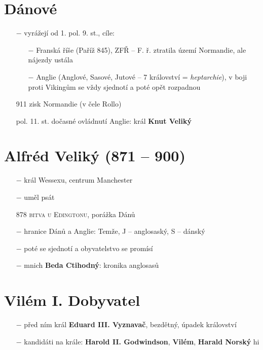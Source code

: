 \documentclass{article}
\begin{document}
\section*{Dánové}
\begin{itemize}
    \vspace{-0.5em}
    \setlength\itemsep{0.15em}
    \item[$-$] vyrážejí od 1. pol. 9. st., cíle:
    \begin{itemize}
        \vspace{-0.5em}
        \setlength\itemsep{0.15em}
        \item[$-$] Franská říše (Paříž 845), ZFŘ -- F. ř. ztratila území Normandie, ale nájezdy ustála
        \item[$-$] Anglie (Anglové, Sasové, Jutové -- 7 království = \textit{heptarchie}), v boji proti Vikingům se vždy sjednotí a poté opět rozpadnou
    \end{itemize}
    \item[911] zisk Normandie (v čele Rollo)
    \item[pol. 11. st.] dočasné ovládnutí Anglie: král \textbf{Knut Veliký}
\end{itemize}

\section*{Alfréd Veliký (871 -- 900)}
\begin{itemize}
    \vspace{-0.5em}
    \setlength\itemsep{0.15em}
    \item[$-$] král Wessexu, centrum Manchester
    \item[$-$] uměl psát
    \item[878] \textsc{bitva u Edingtonu}, porážka Dánů
    \item[$-$] hranice Dánů a Anglie: Temže, J -- anglosaský, S -- dánský
    \item[$-$] poté se sjednotí a obyvatelstvo se promísí
    \item[$-$] mnich \textbf{Beda Ctihodný}: kronika anglosasů
\end{itemize}

\section*{Vilém I. Dobyvatel}
\begin{itemize}
    \vspace{-0.5em}
    \setlength\itemsep{0.15em}
    \item[$-$] před ním král \textbf{Eduard III. Vyznavač}, bezdětný, úpadek království
    \item[$-$] kandidáti na krále: \textbf{Harold II. Godwindson}, \textbf{Vilém}, \textbf{Harald Norský}
    hi

\end{itemize}
\end{document}
